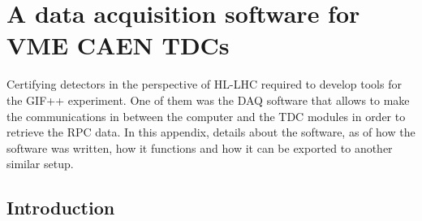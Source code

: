 \graphicspath{{chapt_dutch/}{intro/}{chapt2/}{chapt3/}{chapt4/}{chapt5/}{chapt6/}{chapt7/}}

\renewcommand\evenpagerightmark{{\scshape\small Appendix A}}
\renewcommand\oddpageleftmark{{\scshape\small A data acquisition software for VME CAEN TDCs}}

\renewcommand{\bibname}{References}

\hyphenation{}

\chapter[A data acquisition software for VME CAEN TDCs]%
{A data acquisition software for VME CAEN TDCs}
\label{app1}

Certifying detectors in the perspective of HL-LHC required to develop tools for the GIF++ experiment. One of them was the \acf{DAQ} software that allows to make the communications in between the computer and the TDC modules in order to retrieve the RPC data. In this appendix, details about the software, as of how the software was written, how it functions and how it can be exported to another similar setup.

\section{Introduction}


\clearpage{\pagestyle{empty}\cleardoublepage}
